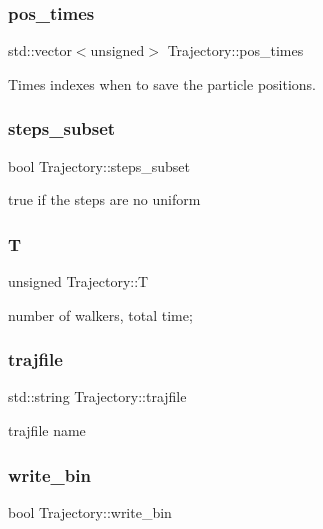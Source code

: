 \subsubsection{\texorpdfstring{pos\+\_\+times}{pos\_times}}
{\footnotesize\ttfamily std\+::vector$<$unsigned$>$ Trajectory\+::pos\+\_\+times}

Times indexes when to save the particle positions. \mbox{\label{class_trajectory_a973422e0d41afe4720fbbf62500a5035}} 
\subsubsection{\texorpdfstring{steps\+\_\+subset}{steps\_subset}}
{\footnotesize\ttfamily bool Trajectory\+::steps\+\_\+subset}

true if the steps are no uniform \mbox{\label{class_trajectory_ad9cbff5cf9f84ca1e2378d1d6105c5e3}} 
\subsubsection{\texorpdfstring{T}{T}}
{\footnotesize\ttfamily unsigned Trajectory\+::T}

number of walkers, total time; \mbox{\label{class_trajectory_aee056cca538c4430eacff9534e43bc8e}} 
\subsubsection{\texorpdfstring{trajfile}{trajfile}}
{\footnotesize\ttfamily std\+::string Trajectory\+::trajfile}

trajfile name \mbox{\label{class_trajectory_a7135e87575f429a7d6ad32477dc96e2c}} 
\subsubsection{\texorpdfstring{write\+\_\+bin}{write\_bin}}
{\footnotesize\ttfamily bool Trajectory\+::write\+\_\+bin}

